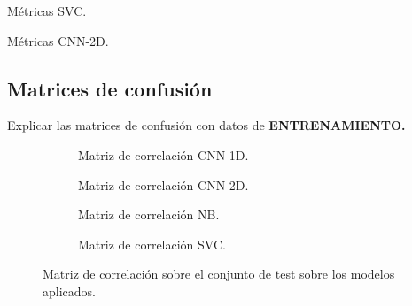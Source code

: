       \begin{table}[H]
        \centering
        \caption{Métricas SVC.}
        \label{SVCDMetrics}
      \end{table}

      \begin{table}[H]
        \centering
        \caption{Métricas CNN-2D.}
        \label{CNN2DMetrics}
      \end{table}


  \subsection{Matrices de confusión}

    Explicar las matrices de confusión con datos de \textbf{ENTRENAMIENTO.}

    \begin{figure}
        \centering
        \begin{subfigure}[b]{0.4\textwidth}
            \centering
            
            \caption{Matriz de correlación CNN-1D.}
            \label{ConfussionMatrixImages:1D}
        \end{subfigure}
        \begin{subfigure}[b]{0.4\textwidth}
            \centering
            
            \caption{Matriz de correlación CNN-2D.} 
            \label{ConfussionMatrixImages:2D}

        \end{subfigure}
        \begin{subfigure}[b]{0.4\textwidth}
            \centering
            
            \caption{Matriz de correlación NB.}
            \label{ConfussionMatrixImages:NB}
        \end{subfigure}
        \begin{subfigure}[b]{0.4\textwidth}
            \centering
            
            \caption{Matriz de correlación SVC.}
            \label{ConfussionMatrixImages:SVC}
        \end{subfigure}
        \caption{Matriz de correlación sobre el conjunto de test sobre los modelos aplicados.}
        \label{ConfussionMatrixImages}
     \end{figure}

